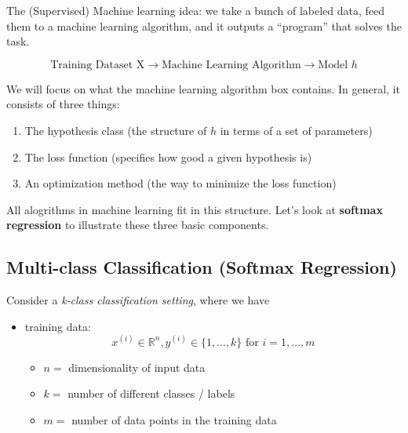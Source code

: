 \documentclass[
  letterpaper,
  DIV=11,
  numbers=noendperiod]{scrreprt}
\providecommand{\tightlist}{%
  \setlength{\itemsep}{0pt}\setlength{\parskip}{0pt}}
\begin{document}

The (Supervised) Machine learning idea: we take a bunch of labeled data,
feed them to a machine learning algorithm, and it outputs a ``program''
that solves the task.

\[\text{Training Dataset X} \rightarrow \boxed{\text{Machine Learning Algorithm}} \rightarrow \text{Model }h\]

We will focus on what the machine learning algorithm box contains. In
general, it consists of three things:

\begin{enumerate}
\def\labelenumi{\arabic{enumi}.}
\tightlist
\item
  The hypothesis class (the structure of \(h\) in terms of a set of
  parameters)
\item
  The loss function (specifies how good a given hypothesis is)
\item
  An optimization method (the way to minimize the loss function)
\end{enumerate}

All alogrithms in machine learning fit in this structure. Let's look at
\textbf{softmax regression} to illustrate these three basic components.

\subsection*{Multi-class Classification (Softmax
Regression)}\label{multi-class-classification-softmax-regression}

Consider a \emph{k-class classification setting}, where we have

\begin{itemize}
\tightlist
\item
  training data:
  \[x^{(i)} \in \mathbb{R}^{n}, y^{(i)} \in \{1, \dots, k \} \text{ for } i = 1, \dots, m\]

  \begin{itemize}
  \tightlist
  \item
    \(n =\) dimensionality of input data
  \item
    \(k =\) number of different classes / labels
  \item
    \(m =\) number of data points in the training data
  \end{itemize}
\end{itemize}
\end{document}
